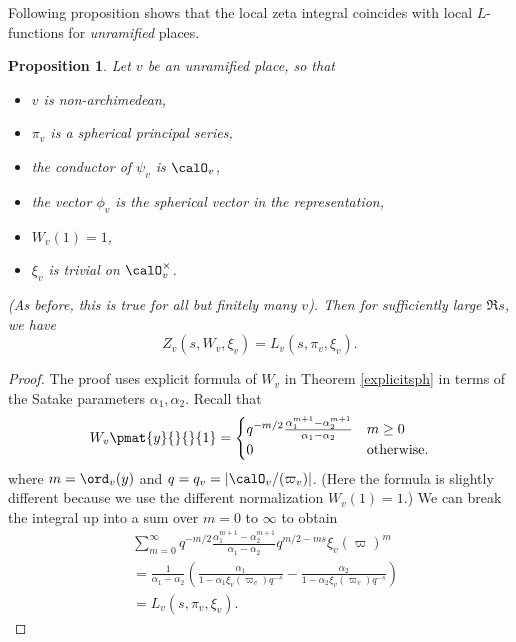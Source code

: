 \documentclass{article}
\newtheorem{theorem}{Theorem}[section]
\newtheorem{proposition}{Proposition}[section]
\begin{document}
Following proposition shows that the local zeta integral coincides with local $L$-functions for \emph{unramified} places. 
\begin{proposition}
Let $v$ be an unramified place, so that 
\begin{itemize}
\item $v$ is non-archimedean, 
\item $\pi_{v}$ is a spherical principal series, 
\item the conductor of $\psi_{v}$ is $\calO_{v}$, 
\item the vector $\phi_{v}$ is the spherical vector in the representation, 
\item $W_{v}(1) = 1$, 
\item $\xi_{v}$ is trivial on $\calO_{v}^{\times}$. 
\end{itemize}
(As before, this is true for all but finitely many $v$). Then for sufficiently large $\Re s$, we have $$Z_{v}(s, W_{v}, \xi_{v}) = L_{v}(s, \pi_{v}, \xi_{v}).$$ 
\end{proposition}
\begin{proof}
The proof uses explicit formula of $W_{v}$ in Theorem \ref{explicitsph} in terms of the Satake parameters $\alpha_{1}, \alpha_{2}$. Recall that 
$$
W_{v}\pmat{y}{}{}{1} = \begin{cases} q^{-m/2} \frac{\alpha_{1}^{m+1} - \alpha_{2}^{m+1}}{\alpha_{1} - \alpha_{2}} & m\geq 0 \\ 0 & \text{otherwise.} \end{cases}
$$
where $m = \ord_{v}(y)$ and $q = q_{v} = |\calO_{v}/(\varpi_{v})|$. (Here the formula is slightly different because we use the different normalization $W_{v}(1) = 1$.)
We can break the integral up into a sum over $m=0$ to $\infty$ to obtain
\begin{align*}
&\sum_{m=0}^{\infty} q^{-m/2} \frac{\alpha_{1}^{m+1} - \alpha_{2}^{m+1}}{\alpha_{1} - \alpha_{2}} q^{m/2 - ms}\xi_{v}(\varpi)^{m} \\
&= \frac{1}{\alpha_{1} - \alpha_{2}} \left( \frac{\alpha_{1}}{1-\alpha_{1}\xi_{v}(\varpi_{v})q^{-s}} - \frac{\alpha_{2}}{1-\alpha_{2}\xi_{v}(\varpi_{v})q^{-s}}\right)\\
&= L_{v}(s, \pi_{v}, \xi_{v}).
\end{align*}
\end{proof}


\begin{comment}
\begin{theorem}[Local functional equation]
The local zeta integral $Z_{v}(s, W_{v}, \xi_{v})$ converges for sufficiently large $\Re s$, and has meromorphic continuation to all $s$. 
Also, there exists a meromorphic function $\gamma_{v}(s, \pi_{v}, \xi_{v}, \psi_{v})$ such that 
$$
Z_{v}(1-s, \pi_{v}(w_{1})W_{v}, \xi_{v}^{-1}\omega_{v}^{-1}) = \gamma_{v}(s, \pi_{v},\xi_{v}, \psi_{v}) Z_{v}(s, W_{v}, \xi_{v}). 
$$
\end{theorem}
\begin{proof}
non-archimedean case is proved in the previous chapter (Theorem \ref{localfe}). Archimedean case is proved in Jacquet-Langlands' book, which uses Weil representation. 
\end{proof}
\end{comment}
\end{document}
